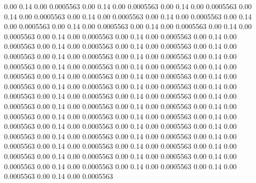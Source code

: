   0.00    0.14    0.00   0.0005563
   0.00    0.14    0.00   0.0005563
   0.00    0.14    0.00   0.0005563
   0.00    0.14    0.00   0.0005563
   0.00    0.14    0.00   0.0005563
   0.00    0.14    0.00   0.0005563
   0.00    0.14    0.00   0.0005563
   0.00    0.14    0.00   0.0005563
   0.00    0.14    0.00   0.0005563
   0.00    0.14    0.00   0.0005563
   0.00    0.14    0.00   0.0005563
   0.00    0.14    0.00   0.0005563
   0.00    0.14    0.00   0.0005563
   0.00    0.14    0.00   0.0005563
   0.00    0.14    0.00   0.0005563
   0.00    0.14    0.00   0.0005563
   0.00    0.14    0.00   0.0005563
   0.00    0.14    0.00   0.0005563
   0.00    0.14    0.00   0.0005563
   0.00    0.14    0.00   0.0005563
   0.00    0.14    0.00   0.0005563
   0.00    0.14    0.00   0.0005563
   0.00    0.14    0.00   0.0005563
   0.00    0.14    0.00   0.0005563
   0.00    0.14    0.00   0.0005563
   0.00    0.14    0.00   0.0005563
   0.00    0.14    0.00   0.0005563
   0.00    0.14    0.00   0.0005563
   0.00    0.14    0.00   0.0005563
   0.00    0.14    0.00   0.0005563
   0.00    0.14    0.00   0.0005563
   0.00    0.14    0.00   0.0005563
   0.00    0.14    0.00   0.0005563
   0.00    0.14    0.00   0.0005563
   0.00    0.14    0.00   0.0005563
   0.00    0.14    0.00   0.0005563
   0.00    0.14    0.00   0.0005563
   0.00    0.14    0.00   0.0005563
   0.00    0.14    0.00   0.0005563
   0.00    0.14    0.00   0.0005563
   0.00    0.14    0.00   0.0005563
   0.00    0.14    0.00   0.0005563
   0.00    0.14    0.00   0.0005563
   0.00    0.14    0.00   0.0005563
   0.00    0.14    0.00   0.0005563
   0.00    0.14    0.00   0.0005563
   0.00    0.14    0.00   0.0005563
   0.00    0.14    0.00   0.0005563
   0.00    0.14    0.00   0.0005563
   0.00    0.14    0.00   0.0005563
   0.00    0.14    0.00   0.0005563
   0.00    0.14    0.00   0.0005563
   0.00    0.14    0.00   0.0005563
